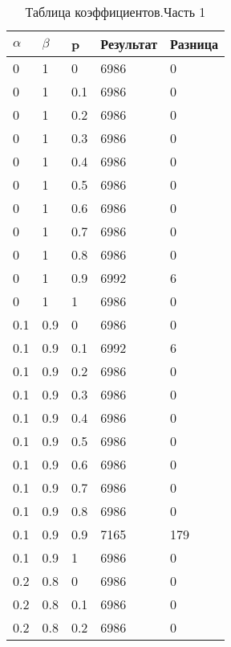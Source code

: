 \newpage


\begin{table}[ht]
	\centering
	\caption{Таблица коэффициентов.Часть 1}
	\label{table:ref1}
	\begin{tabular}{ | l | l | l | l | l |}
		\hline
		$\alpha$ & $\beta$ & p   & Результат & Разница \\
		\hline
		0        & 1       & 0   & 6986      & 0       \\
		0        & 1       & 0.1 & 6986      & 0       \\
		0        & 1       & 0.2 & 6986      & 0       \\
		0        & 1       & 0.3 & 6986      & 0       \\
		0        & 1       & 0.4 & 6986      & 0       \\
		0        & 1       & 0.5 & 6986      & 0       \\
		0        & 1       & 0.6 & 6986      & 0       \\
		0        & 1       & 0.7 & 6986      & 0       \\
		0        & 1       & 0.8 & 6986      & 0       \\
		0        & 1       & 0.9 & 6992      & 6       \\
		0        & 1       & 1   & 6986      & 0       \\
		0.1      & 0.9     & 0   & 6986      & 0       \\
		0.1      & 0.9     & 0.1 & 6992      & 6       \\
		0.1      & 0.9     & 0.2 & 6986      & 0       \\
		0.1      & 0.9     & 0.3 & 6986      & 0       \\
		0.1      & 0.9     & 0.4 & 6986      & 0       \\
		0.1      & 0.9     & 0.5 & 6986      & 0       \\
		0.1      & 0.9     & 0.6 & 6986      & 0       \\
		0.1      & 0.9     & 0.7 & 6986      & 0       \\
		0.1      & 0.9     & 0.8 & 6986      & 0       \\
		0.1      & 0.9     & 0.9 & 7165      & 179     \\
		0.1      & 0.9     & 1   & 6986      & 0       \\
		0.2      & 0.8     & 0   & 6986      & 0       \\
		0.2      & 0.8     & 0.1 & 6986      & 0       \\
		0.2      & 0.8     & 0.2 & 6986      & 0       \\

\end{tabular}
\end{table}
